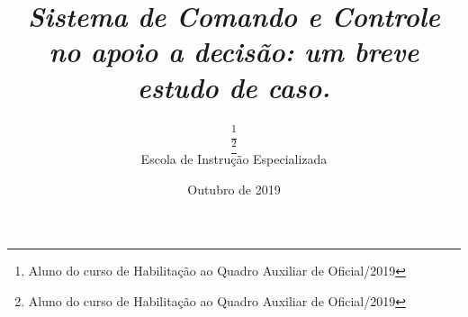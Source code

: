 \title{\textbf{\textit{Sistema de Comando e Controle no apoio a decisão: um breve estudo de caso.}}}
\author{\thanks{Aluno do curso de Habilitação ao Quadro Auxiliar de Oficial/2019}\\ \thanks{Aluno do curso de Habilitação ao Quadro Auxiliar de Oficial/2019}\\Escola de Instrução Especializada}
\date{Outubro de 2019}
